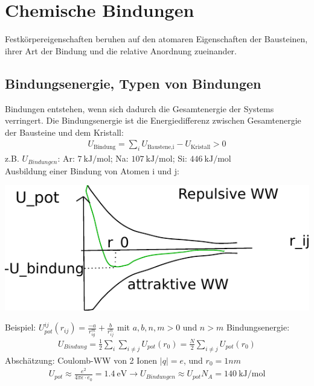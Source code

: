 \newpage
\section{Chemische Bindungen} \label{kap:1}
	Festkörpereigenschaften beruhen auf den atomaren Eigenschaften der Bausteinen, ihrer Art der Bindung und die relative Anordnung zueinander.

\subsection{Bindungsenergie, Typen von Bindungen}\label{kap:1_1}
	Bindungen entstehen, wenn sich dadurch die Gesamtenergie der Systems verringert. Die Bindungsenergie ist die Energiedifferenz zwischen Gesamtenergie der Bausteine und dem Kristall:
	\begin{align}
		U_{\text{Bindung}} = \sum_i U_{\text{Baustene,i}}-U_{\text{Kristall}} > 0
	\end{align}
	z.B. $U_{Bindungen}$:  Ar: $ \SI{7}{\kilo\joule\per\mole} $; Na: $ \SI{107}{\kilo\joule\per\mole} $; Si: $ \SI{446}{\kilo\joule\per\mole}$ \\
	Ausbildung einer Bindung von Atomen i und j:
	\begin{center}
		\includegraphics{figures/1_1graph}
	\end{center}
	Beispiel: $U_{pot}^{ij}(r_{ij})= \frac{-a}{r_{ig}^m}+\frac{b}{r_{ij}^n}$ mit $a,b,n,m > 0$ und $n>m$ \newline
	Bindungsenergie:
	\begin{align}
		U_{Bindung} = \frac{1}{2}\sum_i\sum_{i\neq j}U_{pot}(r_0) = \frac{N}{2} \sum_{i\neq j} U_{pot}(r_0)
	\end{align}
	Abschätzung: Coulomb-WW von 2 Ionen $|q| = e$, und $r_0 = 1nm$
	\begin{align}
		U_{pot} \approx \frac{e^2}{4\pi\epsilon\cdot e_0}=\SI{1.4}{\electronvolt} \rightarrow U_{Bindungen} \approx U_{pot} N_A = \SI{140}{\kilo\joule\per\mole}
	\end{align}

